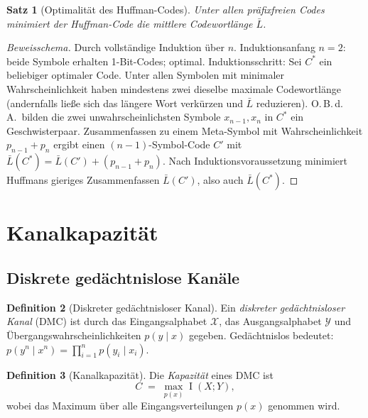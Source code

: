 \documentclass[12pt,a4paper]{amsart}
\newtheorem{theorem}{Satz}[section]
\theoremstyle{definition}
\newtheorem{definition}[theorem]{Definition}
\theoremstyle{remark}
\DeclareMathOperator{\MI}{I}
\begin{document}
\begin{theorem}[Optimalität des Huffman-Codes]\label{satz:huffman}
Unter allen präfixfreien Codes minimiert der Huffman-Code die mittlere
Codewortlänge $\bar{L}$.
\end{theorem}
\begin{proof}[Beweisschema]
Durch vollständige Induktion über $n$. Induktionsanfang $n=2$: beide Symbole
erhalten 1-Bit-Codes; optimal. Induktionsschritt: Sei $C^*$ ein beliebiger
optimaler Code. Unter allen Symbolen mit minimaler Wahrscheinlichkeit haben
mindestens zwei dieselbe maximale Codewortlänge (andernfalls ließe sich das
längere Wort verkürzen und $\bar{L}$ reduzieren). O.\,B.\,d.\,A.\ bilden
die zwei unwahrscheinlichsten Symbole $x_{n-1}, x_n$ in $C^*$ ein
Geschwisterpaar. Zusammenfassen zu einem Meta-Symbol mit Wahrscheinlichkeit
$p_{n-1}+p_n$ ergibt einen $(n-1)$-Symbol-Code $C'$ mit
$\bar{L}(C^*) = \bar{L}(C') + (p_{n-1}+p_n)$. Nach Induktionsvoraussetzung
minimiert Huffmans gieriges Zusammenfassen $\bar{L}(C')$, also auch
$\bar{L}(C^*)$.
\end{proof}

\section{Kanalkapazität}

\subsection{Diskrete gedächtnislose Kanäle}

\begin{definition}[Diskreter gedächtnisloser Kanal]
Ein \emph{diskreter gedächtnisloser Kanal} (DMC) ist durch das Eingangsalphabet
$\mathcal{X}$, das Ausgangsalphabet $\mathcal{Y}$ und Übergangswahrscheinlichkeiten
$p(y \mid x)$ gegeben. Gedächtnislos bedeutet: $p(y^n \mid x^n) =
\prod_{i=1}^n p(y_i \mid x_i)$.
\end{definition}

\begin{definition}[Kanalkapazität]
Die \emph{Kapazität} eines DMC ist
\begin{equation}\label{eq:kapazitaet}
  C \;=\; \max_{p(x)} \MI(X;Y),
\end{equation}
wobei das Maximum über alle Eingangsverteilungen $p(x)$ genommen wird.
\end{definition}
\end{document}
